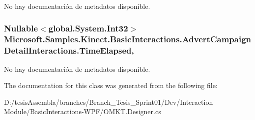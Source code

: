 No hay documentación de metadatos disponible. 

\hypertarget{class_microsoft_1_1_samples_1_1_kinect_1_1_basic_interactions_1_1_advert_campaign_detail_interactions_aefcfbf4807c518573ce1c88db2427599}{
\subsubsection[{Time\-Elapsed}]{\setlength{\rightskip}{0pt plus 5cm}Nullable$<$global.\-System.\-Int32$>$ Microsoft.\-Samples.\-Kinect.\-Basic\-Interactions.\-Advert\-Campaign\-Detail\-Interactions.\-Time\-Elapsed\hspace{0.3cm}{\ttfamily [get]}, {\ttfamily [set]}}}\label{class_microsoft_1_1_samples_1_1_kinect_1_1_basic_interactions_1_1_advert_campaign_detail_interactions_aefcfbf4807c518573ce1c88db2427599}


No hay documentación de metadatos disponible. 



The documentation for this class was generated from the following file\-:\begin{DoxyCompactItemize}
\item 
D\-:/tesis\-Assembla/branches/\-Branch\-\_\-\-Tesis\-\_\-\-Sprint01/\-Dev/\-Interaction Module/\-Basic\-Interactions-\/\-W\-P\-F/O\-M\-K\-T.\-Designer.\-cs\end{DoxyCompactItemize}
